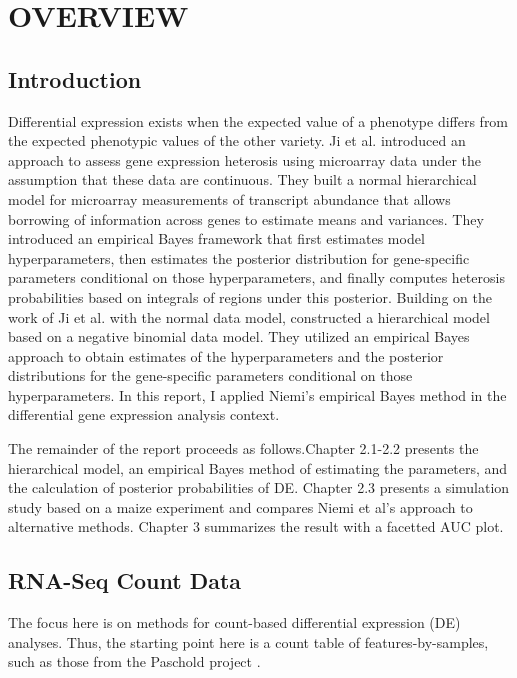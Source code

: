 \chapter{OVERVIEW}



\section{Introduction}

Differential expression exists when the expected value of a phenotype differs from the expected phenotypic values of the other variety. Ji et al. \citep{ji2014estimation} introduced an approach to assess gene expression heterosis using microarray data under the assumption that these data are continuous. They built a normal hierarchical model for microarray measurements of transcript abundance that allows borrowing of information across genes to estimate means and variances. They introduced an empirical Bayes framework that first estimates model hyperparameters, then estimates the posterior distribution for gene-specific parameters conditional on those hyperparameters, and finally computes heterosis probabilities based on integrals of regions under this posterior. Building on the work of Ji et al. with the normal data model, \citep{niemi2015empirical} constructed a hierarchical model based on a negative binomial data model. They utilized an empirical Bayes approach to obtain estimates of the hyperparameters and the posterior distributions for the gene-specific parameters conditional on those hyperparameters. In this report, I applied Niemi's empirical Bayes method in the differential gene expression analysis context. 


The remainder of the report proceeds as follows.Chapter 2.1-2.2 presents the hierarchical model, an empirical Bayes method of estimating the parameters, and the calculation of posterior probabilities of DE. Chapter 2.3 presents a simulation study based on a maize experiment and compares Niemi et al's approach to alternative methods. Chapter 3 summarizes the result with a facetted AUC plot.


\section{RNA-Seq Count Data}
The focus here is on methods for count-based differential expression (DE) analyses. Thus, the starting point here is a count table of features-by-samples, such as those from the Paschold project \citep{paschold2012complementation}.

